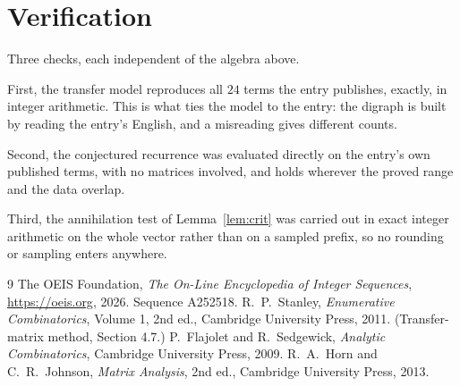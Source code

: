 \documentclass[11pt,a4paper]{article}
\theoremstyle{plain}
\theoremstyle{definition}
\begin{document}
\section{Verification}

Three checks, each independent of the algebra above.

First, the transfer model reproduces all $24$ terms the entry publishes, exactly, in
integer arithmetic. This is what ties the model to the entry: the digraph is built by reading
the entry's English, and a misreading gives different counts.

Second, the conjectured recurrence was evaluated directly on the entry's own published terms,
with no matrices involved, and holds wherever the proved range and the data overlap.

Third, the annihilation test of Lemma~\ref{lem:crit} was carried out in exact integer
arithmetic on the whole vector rather than on a sampled prefix, so no rounding or sampling
enters anywhere.

\begin{thebibliography}{9}
 The OEIS Foundation, \emph{The On-Line Encyclopedia of Integer
Sequences}, \url{https://oeis.org}, 2026. Sequence A252518.
 R.~P.~Stanley, \emph{Enumerative Combinatorics}, Volume 1, 2nd ed.,
Cambridge University Press, 2011. (Transfer-matrix method, Section 4.7.)
 P.~Flajolet and R.~Sedgewick, \emph{Analytic Combinatorics}, Cambridge
University Press, 2009.
 R.~A.~Horn and C.~R.~Johnson, \emph{Matrix Analysis}, 2nd ed., Cambridge
University Press, 2013.
\end{thebibliography}
\end{document}
